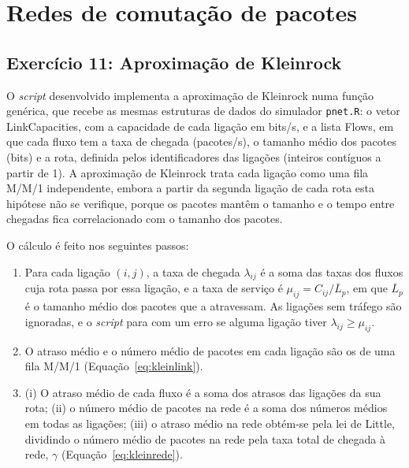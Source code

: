 \documentclass[10pt,a4paper]{article}
\begin{document}
\newpage

\section{Redes de comutação de pacotes}

\subsection{Exercício 11: Aproximação de Kleinrock}

O \textit{script} desenvolvido implementa a aproximação de Kleinrock numa função genérica, que recebe as mesmas estruturas de dados do simulador \texttt{pnet.R}: o vetor LinkCapacities, com a capacidade de cada ligação em bits/s, e a lista Flows, em que cada fluxo tem a taxa de chegada (pacotes/s), o tamanho médio dos pacotes (bits) e a rota, definida pelos identificadores das ligações (inteiros contíguos a partir de 1). A aproximação de Kleinrock trata cada ligação como uma fila M/M/1 independente, embora a partir da segunda ligação de cada rota esta hipótese não se verifique, porque os pacotes mantêm o tamanho e o tempo entre chegadas fica correlacionado com o tamanho dos pacotes.

O cálculo é feito nos seguintes passos:
\begin{enumerate}
  \item Para cada ligação $(i,j)$, a taxa de chegada $\lambda_{ij}$ é a soma das taxas dos fluxos cuja rota passa por essa ligação, e a taxa de serviço é $\mu_{ij}=C_{ij}/\overline{L}_p$, em que $\overline{L}_p$ é o tamanho médio dos pacotes que a atravessam. As ligações sem tráfego são ignoradas, e o \textit{script} para com um erro se alguma ligação tiver $\lambda_{ij}\geq\mu_{ij}$.
  \item O atraso médio e o número médio de pacotes em cada ligação são os de uma fila M/M/1 (Equação~\ref{eq:kleinlink}).
  \item (i) O atraso médio de cada fluxo é a soma dos atrasos das ligações da sua rota; (ii) o número médio de pacotes na rede é a soma dos números médios em todas as ligações; (iii) o atraso médio na rede obtém-se pela lei de Little, dividindo o número médio de pacotes na rede pela taxa total de chegada à rede, $\gamma$ (Equação~\ref{eq:kleinrede}).
\end{enumerate}
\end{document}
